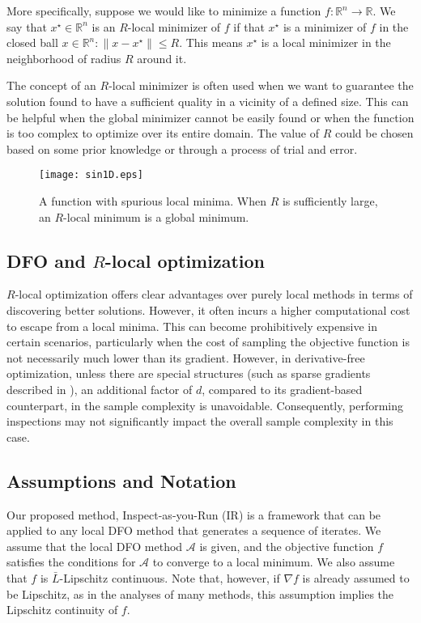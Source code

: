 More specifically, suppose we would like to minimize a function $f: \mathbb{R}^n \rightarrow \mathbb{R}$. We say that $x^\star\in\mathbb{R}^n$ is an $R$-local minimizer of $f$ if  that $x^\star$ is a  minimizer of $f$ in the closed ball ${x \in \mathbb{R}^n: \|x - x^\star\| \leq R}$.
This means $x^\star$ is a local minimizer in the neighborhood of radius $R$ around it. 

The concept of an $R$-local minimizer is often used when we want to guarantee the solution found to have a sufficient quality in a vicinity of a defined size. This can be helpful when the global minimizer cannot be easily found or when the function is too complex to optimize over its entire domain. The value of $R$ could be chosen based on some prior knowledge or through a process of trial and error.

\begin{figure}[t]
    \centering
    \texttt{[image: sin1D.eps]}
    \caption{A function with spurious local minima. When $R$ is sufficiently large, an $R$-local minimum is a global minimum.}
    \label{fig: 1D quad + sin}
\end{figure}

\subsection{DFO and $R$-local optimization}
$R$-local optimization offers clear advantages over purely local methods in terms of discovering better solutions. However, it often incurs a higher computational cost to escape from a local minima.
This can become prohibitively expensive in certain scenarios, particularly when the cost of sampling the objective function is not necessarily much lower than its gradient. However, in derivative-free optimization, unless there are special structures (such as sparse gradients described in \cite{cai2020zeroth}), an additional factor of $d$, compared to its gradient-based counterpart, in the sample complexity is unavoidable. Consequently, performing inspections may not significantly impact the overall sample complexity in this case.

\subsection{Assumptions and Notation}
Our proposed method, Inspect-as-you-Run (IR) is a framework that can be applied to any local DFO method that generates a sequence of iterates. 
We assume that the local DFO method $\mathcal{A}$ is given,
and the objective function $f$ satisfies the conditions for $\mathcal{A}$ to converge to a local minimum.
We also assume that $f$ is $\bar{L}$-Lipschitz continuous. Note that, however, if $\nabla f$ is already assumed to be Lipschitz, as in the analyses of many methods, this assumption implies the Lipschitz continuity of $f$.

